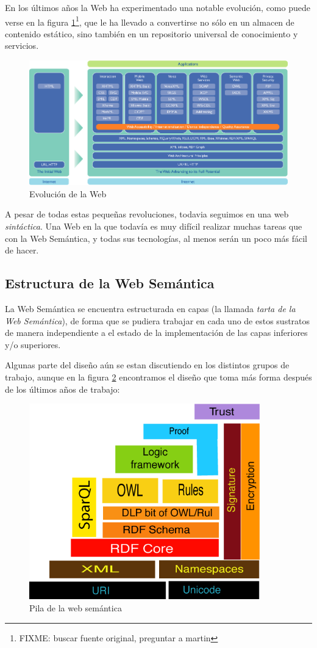 En los últimos años la Web ha experimentado una notable evolución, como puede 
verse en la figura \ref{fig:evoWeb}\footnote{FIXME: buscar fuente original, preguntar a martin}, 
que le ha llevado a convertirse no sólo en un almacen de contenido estático, 
sino también en un repositorio universal de conocimiento y servicios.

\begin{figure}[tp]
	\centering
	\includegraphics[width=12cm]{images/web-evolution.png}
	\caption{Evolución de la Web}
	\label{fig:evoWeb}
\end{figure}

A pesar de todas estas pequeñas revoluciones, todavia seguimos en una web 
\emph{sintáctica}. Una Web en la que todavía es muy difícil realizar
muchas tareas que con la Web Semántica, y todas sus tecnologías, al menos
serán un poco más fácil de hacer.

\subsection{Estructura de la Web Semántica}

La Web Semántica se encuentra estructurada en capas (la llamada \emph{tarta de 
la Web Semántica}), de forma que se pudiera trabajar en cada uno de estos
sustratos de manera independiente a el estado de la implementación de las
capas inferiores y/o superiores.

Algunas parte del diseño aún se estan discutiendo en los distintos grupos de
trabajo, aunque en la figura \ref{fig:swStack} encontramos el diseño que toma
más forma después de los últimos años de trabajo:

\begin{figure}[tp]
	\centering
	\includegraphics[width=10cm]{images/semantic-web-stack.png}
	\caption{Pila de la web semántica}
	\label{fig:swStack}
\end{figure}

